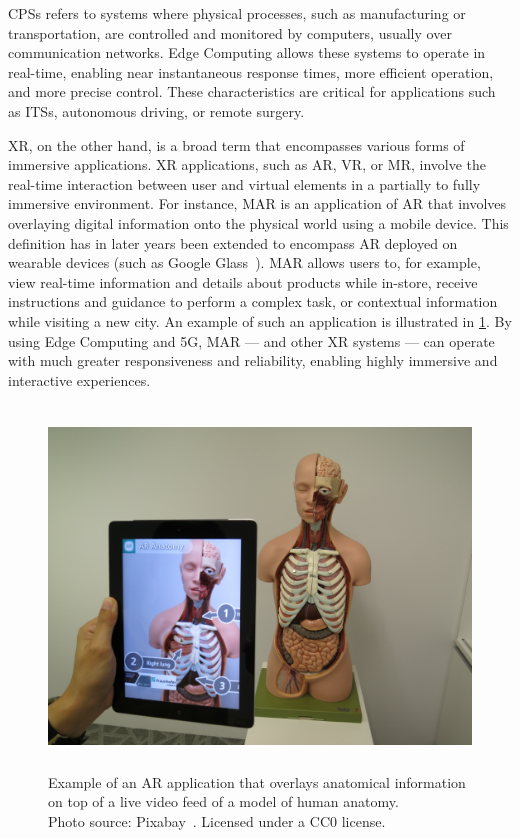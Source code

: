 \glspl{CPS} refers to systems where physical processes, such as manufacturing or transportation, are controlled  and monitored by computers, usually over communication networks.
Edge Computing allows these systems to operate in real-time, enabling near instantaneous response times, more efficient operation, and more precise control.
These characteristics are critical for applications such as \glspl{ITS}, autonomous driving, or remote surgery.

\gls{XR}, on the other hand, is a broad term that encompasses various forms of immersive applications.
\gls{XR} applications, such as \gls{AR}, \gls{VR}, or \gls{MR}, involve the real-time interaction between user and virtual elements in a partially to fully immersive environment.
For instance, \gls{MAR} is an application of \gls{AR} that involves overlaying digital information onto the physical world using a mobile device.
This definition has in later years been extended to encompass \gls{AR} deployed on wearable devices (such as Google Glass~\cite{googleglass}).
\gls{MAR} allows users to, for example, view real-time information and details about products while in-store, receive instructions and guidance to perform a complex task, or contextual information while visiting a new city.
An  example of such an application is illustrated in \cref{fig:augmentedreality}.
By using Edge Computing and 5G, \gls{MAR} --- and other \gls{XR} systems --- can operate with much greater responsiveness and reliability, enabling highly immersive and interactive experiences.

\begin{figure}
    \centering
    \includegraphics[height=26em]{figures/AR}
    \caption[{ }]{
        Example of an \gls{AR} application that overlays anatomical information on top of a live video feed of a model of human anatomy.\\
    
        {
            \footnotesize%
            Photo source: Pixabay~\cite{picture:AR}.
            Licensed under a \gls{CC0} license.
        }
    }\label{fig:augmentedreality}
\end{figure}

